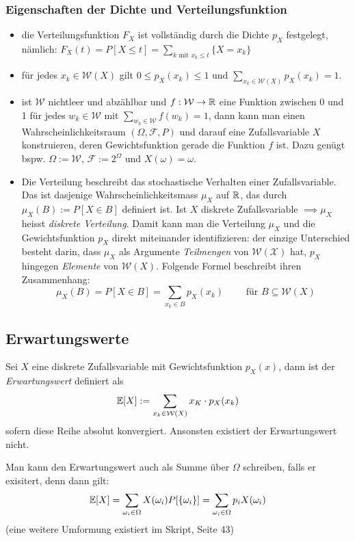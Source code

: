 \subsubsection*{Eigenschaften der Dichte und Verteilungsfunktion}
\begin{itemize}
\item die Verteilungsfunktion $F_X$ ist vollständig durch die Dichte $p_X$ festgelegt, nämlich: $F_X(t) = P[X \leq t] = \sum_{k \mbox{ mit } x_k \leq t} \{X = x_k\}$
\item für jedes $x_k \in \mathcal{W}(X)$ gilt $0 \leq p_X(x_k) \leq 1$ und $\sum_{x_k \in \mathcal{W}(X)} p_X(x_k) = 1$.
\item ist $\mathcal{W}$ nichtleer und abzählbar und $f:\mathcal{W}\to \mathbb{R}$ eine Funktion zwischen 0 und 1 für jedes $w_k \in \mathcal{W}$ mit $\sum_{w_k \in \mathcal{W}} f(w_k) = 1$, dann kann man einen Wahrscheinlichkeitsraum $(\Omega, \mathcal{F}, P)$ und darauf eine Zufallsvariable $X$ konstruieren, deren Gewichtsfunktion gerade die Funktion $f$ ist. Dazu genügt bspw. $\Omega := \mathcal{W}$, $\mathcal{F} := 2^\Omega$ und $X(\omega) = \omega$.
\item Die Verteilung beschreibt das stochastische Verhalten einer Zufallsvariable. Das ist dasjenige Wahrscheinlichkeitsmass $\mu_X$ auf $\mathbb{R}$, das durch $\mu_X(B) := P[X \in B]$ definiert ist. Ist $X$ diskrete Zufallsvariable $\implies \mu_X$ heisst \textit{diskrete Verteilung}. Damit kann man die Verteilung $\mu_X$ und die Gewichtsfunktion $p_X$ direkt miteinander identifizieren: der einzige Unterschied besteht darin, dass $\mu_X$ als Argumente \textit{Teilmengen} von $\mathcal{W(X)}$ hat, $p_X$ hingegen \textit{Elemente} von $\mathcal{W}(X)$. Folgende Formel beschreibt ihren Zusammenhang:
$$ \mu_X(B) = P[X \in B] = \sum_{x_k \in B} p_X(x_k) \quad \quad \mbox{ für } B\subseteq \mathcal{W}(X)$$
\end{itemize}


\subsection{Erwartungswerte}
\begin{definition}
Sei $X$ eine diskrete Zufallsvariable mit Gewichtsfunktion $p_X(x)$, dann ist der \textit{Erwartungswert} definiert als
$$ \mathbb{E}[X] := \sum_{x_k \in \mathcal{W}(X)} x_K \cdot p_X(x_k)$$
sofern diese Reihe absolut konvergiert. Ansonsten existiert der Erwartungswert nicht.
\end{definition}
Man kann den Erwartungswert auch als Summe über $\Omega$ schreiben, falls er exisitert, denn dann gilt:
$$ \mathbb{E}[X] = \sum_{\omega_i \in \Omega} X(\omega_i) P[\{\omega_i\}] = \sum_{\omega_i \in \Omega} p_i X(\omega_i)$$
(eine weitere Umformung existiert im Skript, Seite 43)

